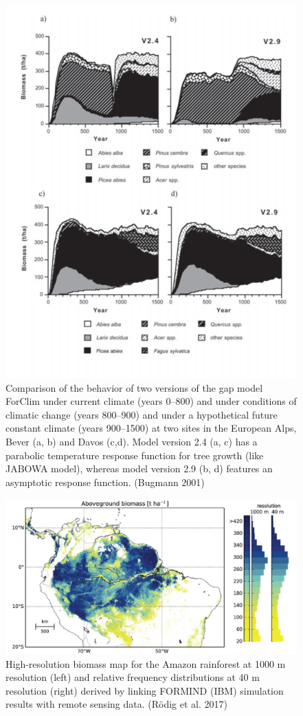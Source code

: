 \documentclass[
  12pt,
  oneside]{book}
\begin{document}
\begin{figure}

{\centering \includegraphics[width=0.8\linewidth]{figures/chap6/f612_forclim_succession} 

}

\caption{Comparison of the behavior of two versions of the gap model ForClim under current climate (years 0–800) and under conditions of climatic change (years 800–900) and under a hypothetical future constant climate (years 900–1500) at two sites in the European Alps, Bever (a, b) and Davos (c,d). Model version 2.4 (a, c) has a parabolic temperature response function for tree growth (like JABOWA model), whereas model version 2.9 (b, d) features an asymptotic response function. (Bugmann 2001)}\label{fig:f612}
\end{figure}

\begin{figure}

{\centering \includegraphics[width=0.8\linewidth]{figures/chap6/f613_formind_amazon} 

}

\caption{High-resolution biomass map for the Amazon rainforest at 1000 m resolution (left) and relative frequency distributions at 40 m resolution (right) derived by linking FORMIND (IBM) simulation results with remote sensing data. (Rödig et al. 2017)}\label{fig:f613}
\end{figure}
\end{document}
